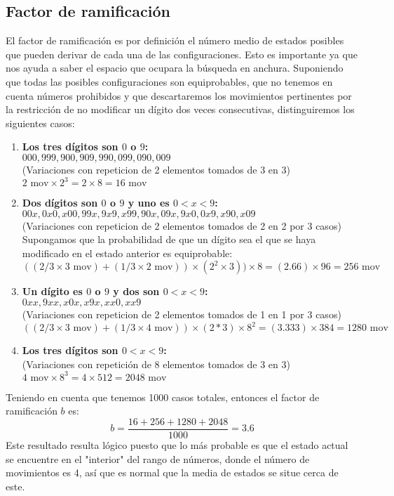 \documentclass[12pt]{article}
\begin{document}
\subsection{Factor de ramificación}
El factor de ramificación es por definición el número medio de estados posibles que pueden derivar de cada una de las configuraciones. Esto es importante ya que nos ayuda a saber el espacio que ocupara la búsqueda en anchura. Suponiendo que todas las posibles configuraciones son equiprobables, que no tenemos en cuenta números prohibidos y que descartaremos los movimientos pertinentes por la restricción de no modificar un dígito dos veces consecutivas, distinguiremos los siguientes casos:
\begin{enumerate}
\item \textbf{Los tres dígitos son $0$ o $9$:}\\
$000,999,900,909,990,099,090,009$\\
(Variaciones con repeticion de 2 elementos tomados de 3 en 3)\\
$2 \mbox{ mov} \times 2^3 = 2 \times 8 = 16\mbox{ mov} $
\item \textbf{Dos dígitos son $0$ o $9$ y uno es $0<x<9$:}\\
$00x,0x0,x00,99x,9x9,x99,90x,09x,9x0,0x9,x90,x09$\\
(Variaciones con repeticion de 2 elementos tomados de 2 en 2 por 3 casos)\\
Supongamos que la probabilidad de que un dígito sea el que se haya modificado en el estado anterior es equiprobable:\\
$((2/3 \times 3 \mbox{ mov} ) + (1/3 \times 2 \mbox{ mov} )) \times (2^2\times3)) \times 8 = (2.66) \times 96 = 256\mbox{ mov} $
\item \textbf{Un dígito es $0$ o $9$ y dos son $0<x<9$:}\\
$0xx,9xx,x0x,x9x,xx0,xx9$\\
(Variaciones con repeticion de 2 elementos tomados de 1 en 1 por 3 casos)\\
$((2/3 \times 3 \mbox{ mov} ) + (1/3 \times 4 \mbox{ mov} )) \times (2*3) \times 8^2 = (3.333)\times 384 = 1280\mbox{ mov} $ 
\item \textbf{Los tres dígitos son $0<x<9$:}\\
(Variaciones con repetición de 8 elementos tomados de 3 en 3)\\
$4 \mbox{ mov}  \times 8^3 = 4 \times 512 = 2048\mbox{ mov} $
\end{enumerate}
Teniendo en cuenta que tenemos 1000 casos totales, entonces el factor de ramificación $b$ es:\\
\begin{equation}
b = \frac{16 + 256 + 1280 + 2048}{1000} = 3.6
\end{equation}
Este resultado resulta lógico puesto que lo más probable es que el estado actual se encuentre en el "interior" del rango de números, donde el número de movimientos es 4, así que es normal que la media de estados se situe cerca de este.
\end{document}
